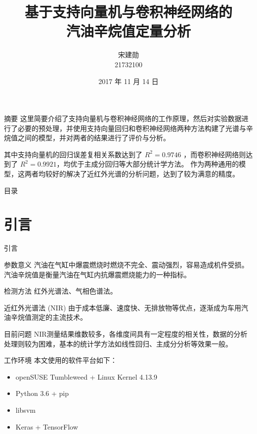 \documentclass[11pt]{beamer}
\begin{document}
	\author{宋建勋 \\ 21732100}
	\title[汽油辛烷值定量分析]{基于支持向量机与卷积神经网络的 \\ 汽油辛烷值定量分析}
	\date{2017 年 11 月 14 日}
	\begin{frame}[plain]
		\maketitle
	\end{frame}
	\begin{frame}{摘要}
		这里简要介绍了支持向量机与卷积神经网络的工作原理，然后对实验数据进行了必要的预处理，并使用支持向量回归和卷积神经网络两种方法构建了光谱与辛烷值之间的模型，并对两者的结果进行了评价与分析。
		
		
		\bigskip 其中支持向量机的回归误差复相关系数达到了 $R^2=0.9746$ ，而卷积神经网络则达到了 $R^2=0.9921$，均优于主成分回归等大部分统计学方法。
		作为两种通用的模型，这两者均较好的解决了近红外光谱的分析问题，达到了较为满意的精度。
	\end{frame}
	
	\begin{frame}{目录}
		\tableofcontents
	\end{frame}
	\section{引言}
	\begin{frame}{引言}
		\begin{block}{参数意义}
			汽油在气缸中爆震燃烧时燃烧不完全、震动强烈，容易造成机件受损。
			汽油辛烷值是衡量汽油在气缸内抗爆震燃烧能力的一种指标。
		\end{block}
		
		\begin{block}{检测方法}
			红外光谱法、气相色谱法。
			
			近红外光谱法 (NIR) 由于成本低廉、速度快、无排放物等优点，逐渐成为车用汽油辛烷值测定的主流技术。
		\end{block}
		\begin{block}{目前问题}
			NIR测量结果维数较多，各维度间具有一定程度的相关性，数据的分析处理则较为困难，基本的统计学方法如线性回归、主成分分析等效果一般。
		\end{block}
	\end{frame}
	\begin{frame}{工作环境}
		\noindent 本文使用的软件平台如下：
		\begin{itemize}
			\item openSUSE Tumbleweed + Linux Kernel 4.13.9
			\item Python 3.6 + pip
			\item libsvm
			\item Keras + TensorFlow
		\end{itemize}
	\end{frame}
	
\end{document}
